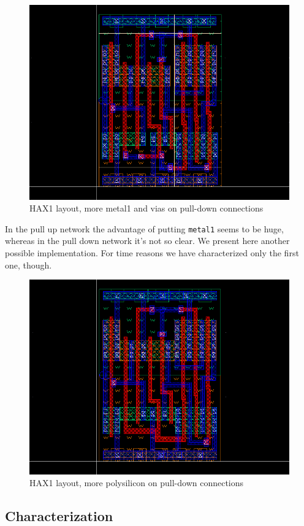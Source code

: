 \documentclass[a4paper]{article}
\begin{document}
\begin{figure}[H]
      \centering
       \includegraphics[width=12cm]{./Images/HA/HAX1_poly-metal_layout.png}
\caption{HAX1 layout, more metal1 and vias on pull-down connections}
\label{fig: HAX1_lay_drw}
\end{figure}

In the pull up network the advantage of putting \texttt{metal1} seems to be huge, whereas in the pull down network it's not so clear. We present here another possible implementation. For time reasons we have characterized only the first one, though.

\begin{figure}[H]
      \centering
       \includegraphics[width=12cm]{./Images/HA/HAX1_poly_layout.png}
\caption{HAX1 layout, more polysilicon on pull-down connections}
\label{fig: HAX1_layPoly_drw}
\end{figure}

\subsection{Characterization}
\end{document}
